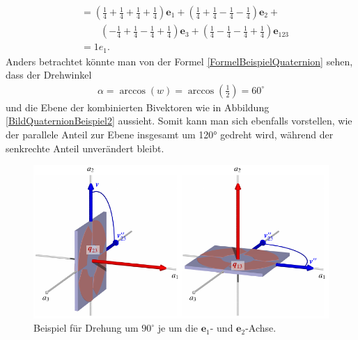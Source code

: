 \begin{beispiel}
\begin{align*}
	&= (\textstyle{\frac{1}{4}} + \textstyle{\frac{1}{4}} + \textstyle{\frac{1}{4}} + \textstyle{\frac{1}{4}})\mathbf{e}_1 + (\textstyle{\frac{1}{4}} + \textstyle{\frac{1}{4}} - \textstyle{\frac{1}{4}} - \textstyle{\frac{1}{4}})\mathbf{e}_2 +\\ &\qquad(-\textstyle{\frac{1}{4}} + \textstyle{\frac{1}{4}} - \textstyle{\frac{1}{4}} + \textstyle{\frac{1}{4}})\mathbf{e}_3 + (\textstyle{\frac{1}{4}} - \textstyle{\frac{1}{4}} - \textstyle{\frac{1}{4}} + \textstyle{\frac{1}{4}})\mathbf{e}_{123}\\
	&= 1e_1. 
	\end{align*}
	Anders betrachtet könnte man von der Formel \eqref{FormelBeispielQuaternion} sehen, dass der Drehwinkel
	\begin{align*}
	\alpha = \arccos(w) = \arccos(\textstyle{\frac{1}{2}}) = 60^\circ
	\end{align*}
	und die Ebene der kombinierten Bivektoren wie in Abbildung \ref{BildQuaternionBeispiel2} aussieht.
	Somit kann man sich ebenfalls vorstellen, wie der parallele Anteil zur Ebene insgesamt um 120° gedreht wird, während der senkrechte Anteil unverändert bleibt.
\end{beispiel}

\begin{figure}
	\centering
	\includegraphics{papers/clifford/3d/qq.pdf}
	
	\caption{Beispiel für Drehung um $90^\circ$ je um die $\mathbf{e}_1$- und $\mathbf{e}_2$-Achse.}
	\label{BildQuaternionBeispiel}
\end{figure}

